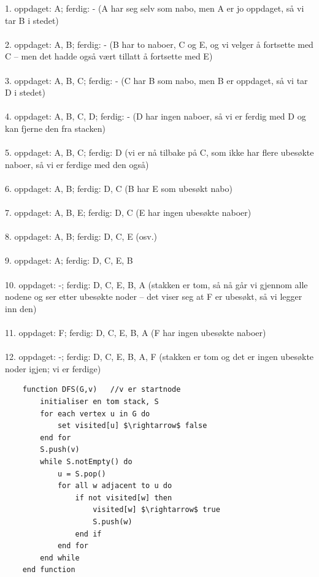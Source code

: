 \begin{boxed}
1. oppdaget: A; ferdig: - (A har seg selv som nabo, men A er jo oppdaget, så vi tar B i stedet)\\\\
2. oppdaget: A, B; ferdig: - (B har to naboer, C og E, og vi velger å fortsette med C – men det hadde også vært tillatt å fortsette med E)\\\\
3. oppdaget: A, B, C; ferdig: - (C har B som nabo, men B er oppdaget, så vi tar D i stedet)\\\\
4. oppdaget: A, B, C, D; ferdig: - (D har ingen naboer, så vi er ferdig med D og kan fjerne den fra stacken)\\\\
5. oppdaget: A, B, C; ferdig: D (vi er nå tilbake på C, som ikke har flere ubesøkte naboer, så vi er ferdige med den også)\\\\
6. oppdaget: A, B; ferdig: D, C (B har E som ubesøkt nabo)\\\\
7. oppdaget: A, B, E; ferdig: D, C (E har ingen ubesøkte naboer)\\\\
8. oppdaget: A, B; ferdig: D, C, E (osv.)\\\\
9. oppdaget: A; ferdig: D, C, E, B\\\\
10. oppdaget: -; ferdig: D, C, E, B, A (stakken er tom, så nå går vi gjennom alle nodene og ser etter ubesøkte noder – det viser seg at F er ubesøkt, så vi legger inn den)\\\\
11. oppdaget: F; ferdig: D, C, E, B, A (F har ingen ubesøkte naboer)\\\\
12. oppdaget: -; ferdig: D, C, E, B, A, F (stakken er tom og det er ingen ubesøkte noder igjen; vi er ferdige)
\end{boxed}

\begin{lstlisting}
    function DFS(G,v)	//v er startnode
	    initialiser en tom stack, S
    	for each vertex u in G do
    		set visited[u] $\rightarrow$ false
    	end for
    	S.push(v)
    	while S.notEmpty() do
    		u = S.pop()
    		for all w adjacent to u do
    			if not visited[w] then
    				visited[w] $\rightarrow$ true
    				S.push(w)
    			end if
    		end for
    	end while
    end function
\end{lstlisting}

